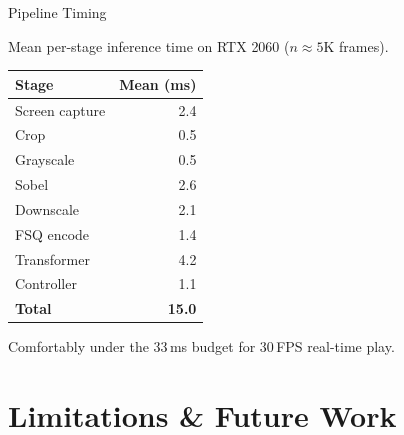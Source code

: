 \documentclass[aspectratio=169]{beamer}
\begin{document}
\begin{frame}{Pipeline Timing}
  \vspace{0.5em}
  \begin{center}
    Mean per-stage inference time on RTX 2060 ($n\approx 5\text{K}$ frames).
  \end{center}

  \vspace{-0.2em}
  \begin{center}
    \begin{tabular}{lr}
      \toprule
      \textbf{Stage} & \textbf{Mean (ms)} \\
      \midrule
      Screen capture & 2.4 \\
      Crop           & 0.5 \\
      Grayscale      & 0.5 \\
      Sobel          & 2.6 \\
      Downscale      & 2.1 \\
      FSQ encode     & 1.4 \\
      Transformer    & 4.2 \\
      Controller     & 1.1 \\
      \midrule
      \textbf{Total} & \textbf{15.0} \\
      \bottomrule
    \end{tabular}
  \end{center}

  \vspace{0.5em}
  \begin{center}
    \small
    Comfortably under the 33\,ms budget for 30\,FPS real-time play.
  \end{center}
\end{frame}

\section{Limitations \& Future Work}
\end{document}
